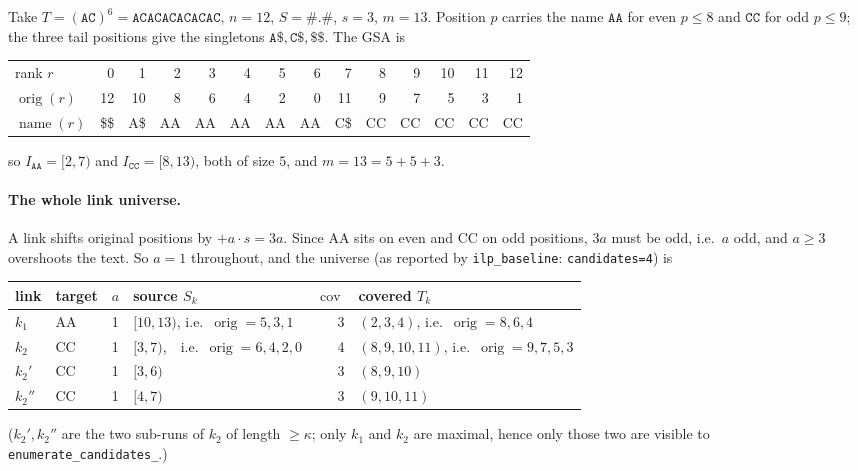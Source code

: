 \documentclass[11pt,a4paper]{article}
\theoremstyle{definition}
\theoremstyle{plain}
\theoremstyle{remark}
\newcommand{\cov}{\operatorname{cov}}
\newcommand{\orig}{\operatorname{orig}}
\newcommand{\name}{\operatorname{name}}
\begin{document}
Take $T = (\mathtt{AC})^6 = \mathtt{ACACACACACAC}$, $n = 12$,
$S = \mathtt{\#.\#}$, $s = 3$, $m = 13$. Position $p$ carries the name
$\mathtt{AA}$ for even $p \le 8$ and $\mathtt{CC}$ for odd $p \le 9$; the
three tail positions give the singletons $\mathtt{A\$}, \mathtt{C\$},
\mathtt{\$\$}$. The GSA is

\begin{center}
\small
\begin{tabular}{@{}lrrrrrrrrrrrrr@{}}
\toprule
rank $r$ & 0 & 1 & 2 & 3 & 4 & 5 & 6 & 7 & 8 & 9 & 10 & 11 & 12 \\
$\orig(r)$ & 12 & 10 & 8 & 6 & 4 & 2 & 0 & 11 & 9 & 7 & 5 & 3 & 1 \\
$\name(r)$ & \$\$ & A\$ & AA & AA & AA & AA & AA & C\$ & CC & CC & CC & CC & CC \\
\bottomrule
\end{tabular}
\end{center}

so $I_{\mathtt{AA}} = [2,7)$ and $I_{\mathtt{CC}} = [8,13)$, both of size
$5$, and $m = 13 = 5 + 5 + 3$.

\paragraph{The whole link universe.}
A link shifts original positions by $+a\cdot s = 3a$. Since AA sits on
even and CC on odd positions, $3a$ must be odd, i.e.\ $a$ odd, and
$a \ge 3$ overshoots the text. So $a = 1$ throughout, and the universe
(as reported by \texttt{ilp\_baseline}: \texttt{candidates=4}) is

\begin{center}
\small
\begin{tabular}{@{}llllrl@{}}
\toprule
link & target & $a$ & source $S_k$ & $\cov$ & covered $T_k$ \\
\midrule
$k_1$   & AA & 1 & $[10,13)$, i.e.\ $\orig = 5,3,1$ & 3 & $(2,3,4)$, i.e.\ $\orig = 8,6,4$ \\
$k_2$   & CC & 1 & $[3,7)$,\ \ i.e.\ $\orig = 6,4,2,0$ & 4 & $(8,9,10,11)$, i.e.\ $\orig = 9,7,5,3$ \\
$k_2'$  & CC & 1 & $[3,6)$ & 3 & $(8,9,10)$ \\
$k_2''$ & CC & 1 & $[4,7)$ & 3 & $(9,10,11)$ \\
\bottomrule
\end{tabular}
\end{center}

($k_2', k_2''$ are the two sub-runs of $k_2$ of length $\ge\kappa$; only
$k_1$ and $k_2$ are maximal, hence only those two are visible to
\texttt{enumerate\_candidates\_}.)
\end{document}
